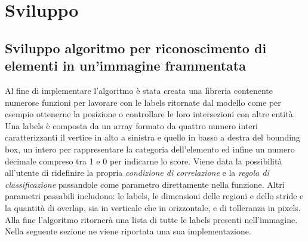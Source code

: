 \section{Sviluppo}
\subsection{Sviluppo algoritmo per riconoscimento di elementi in un'immagine frammentata}
Al fine di implementare l'algoritmo è stata creata una libreria contenente numerose funzioni per lavorare con le labels ritornate dal modello come per esempio ottenerne la posizione o controllare le loro intersezioni con altre entità. Una labels è composta da un array formato da quattro numero interi caratterizzanti il vertice in alto a sinistra e quello in basso a destra del bounding box, un intero per rappresentare la categoria dell'elemento ed infine un numero decimale compreso tra 1 e 0 per indicarne lo score.
Viene data la possibilità all'utente di ridefinire la propria \textit{condizione di correlazione} e la \textit{regola di classificazione} passandole come parametro direttamente nella funzione. Altri parametri passabili includono: le labels, le dimensioni delle regioni e dello stride e la quantità di overlap, sia in verticale che in orizzontale, e di tolleranza in pixels.
Alla fine l'algoritmo ritornerà una lista di tutte le labels presenti nell'immagine.\\ Nella seguente sezione ne viene riportata una sua implementazione.
